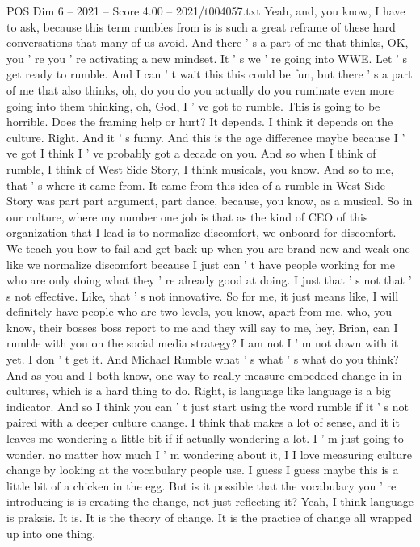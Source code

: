 \begin{textsample}{POS Dim 6 – 2021 – Score 4.00 – 2021/t004057.txt}
Yeah, and, you know, I have to ask, because this term rumbles from is is such a great reframe of these hard conversations that many of us avoid.
And there ' s a part of me that thinks, OK, you ' re you ' re activating a new mindset.
It ' s we ' re going into WWE.
Let ' s get ready to rumble.
And I can ' t wait this this could be fun, but there ' s a part of me that also thinks, oh, do you do you actually do you ruminate even more going into them thinking, oh, God, I ' ve got to rumble.
This is going to be horrible.
Does the framing help or hurt?
It depends.
I think it depends on the culture.
Right.
And it ' s funny.
And this is the age difference maybe because I ' ve got I think I ' ve probably got a decade on you.
And so when I think of rumble, I think of West Side Story, I think musicals, you know.
And so to me, that ' s where it came from.
It came from this idea of a rumble in West Side Story was part part argument, part dance, because, you know, as a musical.
So in our culture, where my number one job is that as the kind of CEO of this organization that I lead is to normalize discomfort, we onboard for discomfort.
We teach you how to fail and get back up when you are brand new and weak one like we normalize discomfort because I just can ' t have people working for me who are only doing what they ' re already good at doing.
I just that ' s not that ' s not effective.
Like, that ' s not innovative.
So for me, it just means like, I will definitely have people who are two levels, you know, apart from me, who, you know, their bosses boss report to me and they will say to me, hey, Brian, can I rumble with you on the social media strategy?
I am not I ' m not down with it yet.
I don ' t get it.
And Michael Rumble what ' s what ' s what do you think?
And as you and I both know, one way to really measure embedded change in in cultures, which is a hard thing to do.
Right, is language like language is a big indicator.
And so I think you can ' t just start using the word rumble if it ' s not paired with a deeper culture change.
I think that makes a lot of sense, and it it leaves me wondering a little bit if if actually wondering a lot.
I ' m just going to wonder, no matter how much I ' m wondering about it, I I love measuring culture change by looking at the vocabulary people use.
I guess I guess maybe this is a little bit of a chicken in the egg.
But is it possible that the vocabulary you ' re introducing is is creating the change, not just reflecting it?
Yeah, I think language is praksis.
It is.
It is the theory of change.
It is the practice of change all wrapped up into one thing.

\end{textsample}
